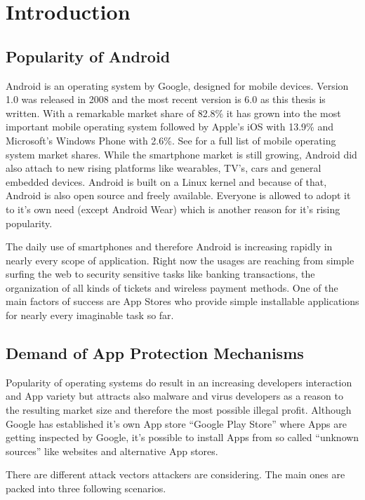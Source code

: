 \chapter{Introduction}\label{chapter:android_status_quo}

\section{Popularity of Android}
Android is an operating system by Google,
designed for mobile devices. Version 1.0 was released
in 2008 and the most recent version is 6.0 as this thesis
is written. With a remarkable market share of 82.8\%
it has grown into the most important mobile operating system
followed by Apple's iOS with 13.9\% and Microsoft's Windows
Phone with 2.6\%. See \parencite{marketshare} for a full list
of mobile operating system market shares. While the smartphone
market is still growing, Android did also attach to new
rising platforms like wearables, TV's, cars and general
embedded devices. Android is built on a Linux kernel
and because of that, Android is also open source and freely
available. Everyone is allowed to adopt it to it's own need
(except Android Wear) which is another reason for it's
rising popularity.

The daily use of smartphones and therefore Android is increasing
rapidly in nearly every scope of application. Right now the usages
are reaching from simple surfing the web to security sensitive tasks
like banking transactions, the organization of all kinds of tickets
and wireless payment methods.
One of the main factors of success are App Stores who provide simple
installable applications for nearly every imaginable task so far.  

\section{Demand of App Protection Mechanisms}
Popularity of operating systems do result in an increasing developers
interaction and App variety but attracts also 
malware and virus developers as a reason to the resulting market
size and therefore the most possible illegal profit.
Although Google has established it's own App store
``Google Play Store'' where Apps are getting inspected by Google,
it's possible to install Apps from so called ``unknown sources''
like websites and alternative App stores.

There are different attack vectors attackers are considering.
The main ones are packed into three following scenarios.

